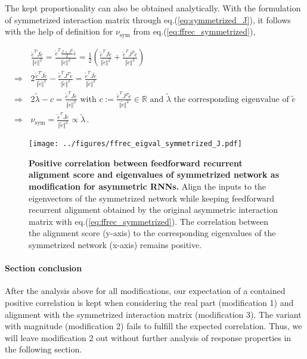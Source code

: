 \documentclass[11pt]{article}
\begin{document}
	The kept proportionality can also be obtained analytically. With the formulation of symmetrized interaction matrix through eq.(\ref{eq:symmetrized_J}), it follows with the help of definition for $\nu_{\text{sym}}$ from eq.(\ref{eq:ffrec_symmetrized}),
	
		\begin{equation}
			\begin{split}
				&\frac{\tilde{e}^T \tilde{J} \tilde{e}}{\Vert \tilde{e} \Vert^2} = \frac{\tilde{e}^T \frac{J + J^T}{2} \tilde{e}}{\Vert \tilde{e} \Vert^2} = \frac{1}{2} \left( \frac{\tilde{e}^T J \tilde{e}}{\Vert \tilde{e} \Vert^2} + \frac{\tilde{e}^T J^T \tilde{e}}{\Vert \tilde{e} \Vert^2} \right) \\
				\Rightarrow \,  & 2 \frac{\tilde{e}^T \tilde{J} \tilde{e}}{\Vert \tilde{e} \Vert^2} - \frac{\tilde{e}^T J^T \tilde{e}}{\Vert \tilde{e} \Vert^2} = \frac{\tilde{e}^T J \tilde{e}}{\Vert \tilde{e} \Vert^2} \\ 
				\Rightarrow \, & 2 \tilde{\lambda} - c = \frac{\tilde{e}^T J \tilde{e}}{\Vert \tilde{e} \Vert^2} \text{ with } c := \frac{\tilde{e}^T J^T \tilde{e}}{\Vert \tilde{e} \Vert^2} \in \mathbb{R} \text{ and $\tilde{\lambda}$ the corresponding eigenvalue of $\tilde{e}$} \\
				\Rightarrow \, & \nu_{\text{sym}} = \frac{\tilde{e}^T J \tilde{e}}{\Vert \tilde{e} \Vert^2} \propto \tilde{\lambda} \, .
			\end{split}
		\end{equation}
	\begin{SCfigure}[0.95][h]
		\centering
		\caption[Positive correlation between feedforward recurrent alignment score and eigenvalues of symmetrized network as modification for asymmetric RNNs]{\textbf{Positive correlation between feedforward recurrent alignment score and eigenvalues of symmetrized network as modification for asymmetric RNNs.} Align the inputs to the eigenvectors of the symmetrized network while keeping feedforward recurrent alignment obtained by the original asymmetric interaction matrix with eq.(\ref{eq:ffrec_symmetrized}). The correlation between the alignment score (y-axis) to the corresponding eigenvalues of the symmetrized network (x-axis) remains positive.}
		\texttt{[image: ../figures/ffrec\_eigval\_symmetrized\_J.pdf]}
		\label{fig:ffrec_symmetrized}
	\end{SCfigure}
	\paragraph{Section conclusion} After the analysis above for all modifications, our expectation of a contained positive correlation is kept when considering the real part (modification 1) and alignment with the symmetrized interaction matrix (modification 3). The variant with magnitude (modification 2) fails to fulfill the expected correlation. Thus, we will leave modification 2 out without further analysis of response properties in the following section. 
	
\end{document}
